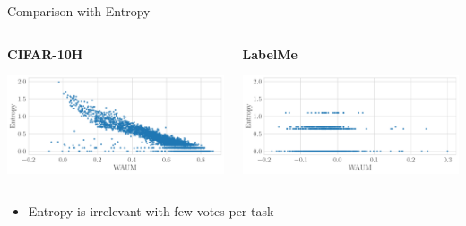 \documentclass[10pt,aspectratio=43,unknownkeysallowed]{beamer}
\begin{document}
\begin{frame}{Comparison with Entropy}
  \begin{columns}
    \begin{column}{.5\textwidth}
      \textbf{CIFAR-10H}
        \begin{center}
            \includegraphics[width=\textwidth]{../chapters/images/scatter_entropy_vs_waum_CIFAR-10H.pdf}
        \end{center}
    \end{column}
    \begin{column}{.5\textwidth}
        \textbf{LabelMe}
        \begin{center}
            \includegraphics[width=\textwidth]{../chapters/images/scatter_entropy_vs_waum_LabelMe.pdf}
        \end{center}
    \end{column}
\end{columns}
\vspace{.5cm}
\begin{itemize}
  \item Entropy is irrelevant with few votes per task
\end{itemize}
\end{frame}
\end{document}
